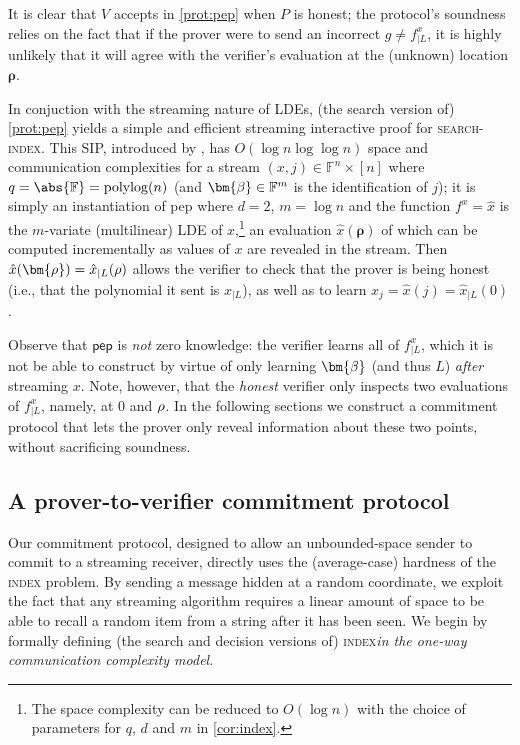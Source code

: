 \documentclass[10pt,a4paper]{article}
\theoremstyle{definition}
\newcommand{\field}{\mathbb{F}}
\newcommand{\polylog}{\operatorname{polylog}}
\newcommand{\indexproblem}{\normalfont\textsc{index}\xspace}
\newcommand{\searchindex}{\normalfont\textsc{search-index}\xspace}
\newcommand{\pepprotocol}{\textsf{pep}\xspace}
\newcommand{\dimension}{m}
\newcommand{\degree}{d}
\newcommand{\fieldsize}{q}
\newcommand{\evaluationpoint}{\bm{\fe2}}
\newcommand{\fingerprinttuple}{\bm{\rho}}
\renewcommand{\line}{L}
\def\fe#1{
    \ifnum#1=1
        \alpha
    \else
    \ifnum#1=2
        \beta
    \else
    \ifnum#1=3
        \gamma
    \fi\fi\fi
}
\def\rfe#1{
    \ifnum#1=1
        \rho
    \else
    \ifnum#1=2
        \sigma
    \else
    \fi\fi
}
\begin{document}
It is clear that $V$ accepts in \cref{prot:pep} when $P$ is honest; the protocol's soundness relies on the fact that if the prover were to send an incorrect $g \neq f^x_{|\line}$, it is highly unlikely that it will agree with the verifier's evaluation at the (unknown) location $\fingerprinttuple$.

In conjuction with the streaming nature of LDEs, (the search version of) \cref{prot:pep} yields a simple and efficient streaming interactive proof for \searchindex. This SIP, introduced by \cite{CCMTV19}, has $O(\log n \log\log n)$ space and communication complexities for a stream $(x, j) \in \field^n \times [n]$ where $\fieldsize = \abs{\field} = \polylog(n)$ (and $\evaluationpoint \in \field^\dimension$ is the identification of $j$); it is simply an instantiation of \pepprotocol where $\degree = 2$, $\dimension = \log n$ and the function $f^x = \hat x$ is the $\dimension$-variate (multilinear) LDE of $x$,\footnote{The space complexity can be reduced to $O(\log n)$ with the choice of parameters for $\fieldsize$, $\degree$ and $\dimension$ in \cref{cor:index}.} an evaluation $\hat x(\fingerprinttuple)$ of which can be computed incrementally as values of $x$ are revealed in the stream. Then $\hat x(\fingerprinttuple) = \hat x_{|\line}(\rfe1)$ allows the verifier to check that the prover is being honest (i.e., that the polynomial it sent is $\hat x_{|\line}$), as well as to learn $x_j = \hat x(j) = \hat x_{|\line}(0)$.

Observe that $\pepprotocol$ is \emph{not} zero knowledge: the verifier learns all of $f^x_{|\line}$, which it is not be able to construct by virtue of only learning $\evaluationpoint$ (and thus $\line$) \emph{after} streaming $x$. Note, however, that the \emph{honest} verifier only inspects two evaluations of $f^x_{|\line}$, namely, at $0$ and $\rfe1$. In the following sections we construct a commitment protocol that lets the prover only reveal information about these two points, without sacrificing soundness.

\subsection{A prover-to-verifier commitment protocol}
\label{sec:pv-commitment}

Our commitment protocol, designed to allow an unbounded-space sender to commit to a streaming receiver, directly uses the (average-case) hardness of the \indexproblem problem. By sending a message hidden at a random coordinate, we exploit the fact that any streaming algorithm requires a linear amount of space to be able to recall a random item from a string after it has been seen. We begin by formally defining (the search and decision versions of) \indexproblem \emph{in the one-way communication complexity model}.
\end{document}
